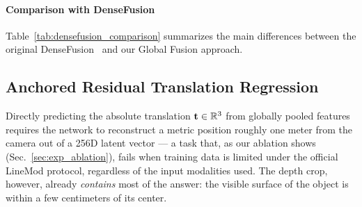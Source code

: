 \paragraph{Comparison with DenseFusion}
Table~\ref{tab:densefusion_comparison} summarizes the main differences between the original DenseFusion~\cite{wang2019densefusion} and our Global Fusion approach.

\begin{table}[t]
    \centering
    \caption{Comparison between DenseFusion and our Global Fusion architecture.}
    \label{tab:densefusion_comparison}
    \small
\end{table}


\subsection{Anchored Residual Translation Regression}
\label{sec:method_anchor}

Directly predicting the absolute translation $\mathbf{t} \in \mathbb{R}^3$ from globally pooled features requires the network to reconstruct a metric position roughly one meter from the camera out of a 256D latent vector --- a task that, as our ablation shows (Sec.~\ref{sec:exp_ablation}), fails when training data is limited under the official LineMod protocol, regardless of the input modalities used. The depth crop, however, already \emph{contains} most of the answer: the visible surface of the object is within a few centimeters of its center.

